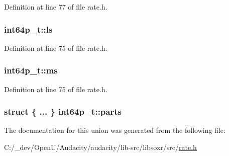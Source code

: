 Definition at line 77 of file rate.\+h.

\subsubsection[{\texorpdfstring{ls}{ls}}]{ int64p\+\_\+t\+::ls}\hypertarget{unionint64p__t_ab20d63e2a65e64bc0beaf2f592e29def}{}\label{unionint64p__t_ab20d63e2a65e64bc0beaf2f592e29def}


Definition at line 75 of file rate.\+h.

\subsubsection[{\texorpdfstring{ms}{ms}}]{ int64p\+\_\+t\+::ms}\hypertarget{unionint64p__t_af620bcbcdc8227cf614d9c87c9152c78}{}\label{unionint64p__t_af620bcbcdc8227cf614d9c87c9152c78}


Definition at line 75 of file rate.\+h.

\subsubsection[{\texorpdfstring{parts}{parts}}]{\setlength{\rightskip}{0pt plus 5cm}struct \{ ... \}   int64p\+\_\+t\+::parts}\hypertarget{unionint64p__t_a4b913516f1e51f6bcc2875fab015346c}{}\label{unionint64p__t_a4b913516f1e51f6bcc2875fab015346c}


The documentation for this union was generated from the following file\+:\begin{DoxyCompactItemize}
\item 
C\+:/\+\_\+dev/\+Open\+U/\+Audacity/audacity/lib-\/src/libsoxr/src/\hyperlink{rate_8h}{rate.\+h}\end{DoxyCompactItemize}

